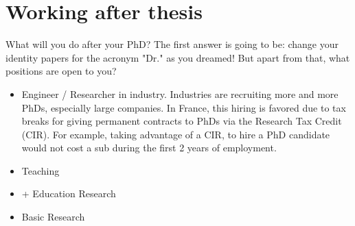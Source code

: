 \section{Working after thesis}
What will you do after your PhD?
The first answer is going to be: change your identity papers for the acronym "Dr." as you dreamed!
But apart from that, what positions are open to you?
\begin{itemize}
  \item Engineer / Researcher in industry. Industries are recruiting more and more PhDs, especially large companies. In France, this hiring is favored due to tax breaks for giving permanent contracts to PhDs via the Research Tax Credit (CIR). For example, taking advantage of a CIR, to hire a PhD candidate would not cost a sub during the first 2 years of employment.
  \item Teaching
  \item + Education Research
  \item Basic Research
\end{itemize}

